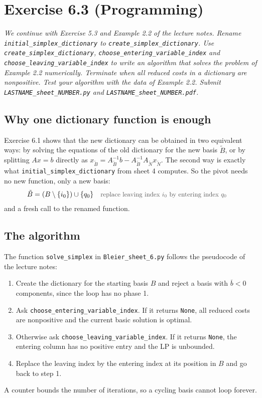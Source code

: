 \documentclass[a4paper,11pt]{article}
\newif\ifexplain
\newcommand{\aufgabe}[1]{\section*{#1}}
\newcommand{\angabe}[1]{\textit{#1}\par\smallskip}
\newcommand{\teil}[1]{\subsection*{#1}}
\newcommand{\why}[1]{\text{\small\color{black!65}#1}}
\newcommand{\explain}[1]{\ifexplain\begin{erklbox}#1\end{erklbox}\fi}
\begin{document}
\aufgabe{Exercise 6.3 (Programming)}
\angabe{We continue with Exercise 5.3 and Example 2.2 of the lecture notes. Rename \texttt{initial\_simplex\_dictionary} to \texttt{create\_simplex\_dictionary}. Use \texttt{create\_simplex\_dictionary}, \texttt{choose\_entering\_variable\_index} and \texttt{choose\_leaving\_variable\_index} to write an algorithm that solves the problem of Example 2.2 numerically. Terminate when all reduced costs in a dictionary are nonpositive. Test your algorithm with the data of Example 2.2. Submit \texttt{LASTNAME\_sheet\_NUMBER.py} and \texttt{LASTNAME\_sheet\_NUMBER.pdf}.}
\teil{Why one dictionary function is enough}
Exercise 6.1 shows that the new dictionary can be obtained in two equivalent ways: by solving the equations of the old dictionary for the new basis $\tilde B$, or by splitting $Ax=b$ directly as $x_{\tilde B}=A_{\tilde B}^{-1}b-A_{\tilde B}^{-1}A_{\tilde N}x_{\tilde N}$. The second way is exactly what \texttt{initial\_simplex\_dictionary} from sheet 4 computes. So the pivot needs no new function, only a new basis:
\begin{align*}
\tilde B&=(B\setminus\{i_0\})\cup\{q_0\}&&\why{replace leaving index $i_0$ by entering index $q_0$}
\end{align*}
and a fresh call to the renamed function.
\explain{Das ist der Kern des Blatts: Ein Pivot ist nichts anderes als eine andere Zerlegung von $Ax=b$. Die Funktion rechnet jedes Mal von der Matrix aus neu, statt Zeilen im alten Dictionary umzuformen. Das ist teurer als In-Place-Umformen, aber einfacher zu testen, und die Zahlen sind dieselben.}
\teil{The algorithm}
The function \texttt{solve\_simplex} in \texttt{Bleier\_sheet\_6.py} follows the pseudocode of the lecture notes:
\begin{enumerate}
\item Create the dictionary for the starting basis $B$ and reject a basis with $\overline b<0$ components, since the loop has no phase 1.
\item Ask \texttt{choose\_entering\_variable\_index}. If it returns \texttt{None}, all reduced costs are nonpositive and the current basic solution is optimal.
\item Otherwise ask \texttt{choose\_leaving\_variable\_index}. If it returns \texttt{None}, the entering column has no positive entry and the LP is unbounded.
\item Replace the leaving index by the entering index at its position in $B$ and go back to step 1.
\end{enumerate}
A counter bounds the number of iterations, so a cycling basis cannot loop forever.
\end{document}
